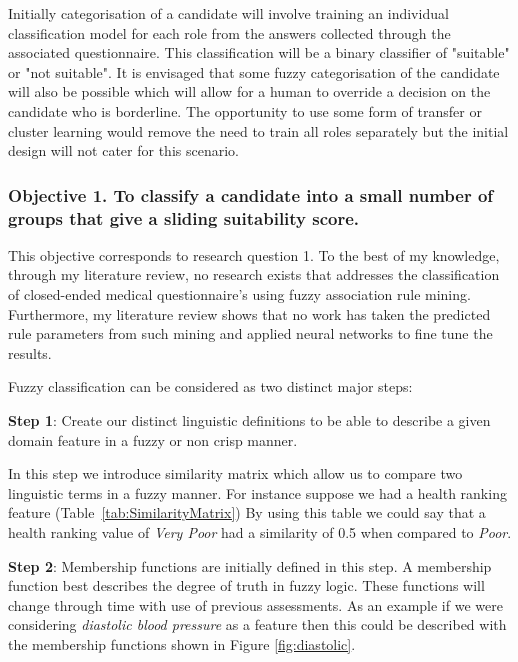 Initially categorisation of a candidate will involve training an individual classification model for each role from
the answers collected through the associated questionnaire. This classification will be a binary classifier
of "suitable" or "not suitable". It is envisaged that some fuzzy categorisation of the candidate will also be
possible which will allow for a human to override a decision on the candidate who is borderline. The opportunity
to use some form of transfer or cluster learning would remove the need to train all roles separately but the initial
design will not cater for this scenario.

\subsubsection{Objective 1. To classify a candidate into a small number of groups that give a sliding suitability score.}

This objective corresponds to research question 1. To the best of my knowledge, through my literature review, no research exists that addresses the classification of closed-ended medical questionnaire's using fuzzy association rule mining. Furthermore, my literature review shows that no work has taken the predicted rule parameters from such mining and applied neural networks to fine tune the results.

\noindent
Fuzzy classification can be considered as two distinct major steps:

\noindent
\textbf{Step 1}: Create our distinct linguistic definitions to be able to describe a given domain feature in a fuzzy or non crisp manner.

In this step we introduce similarity matrix which allow us to compare two linguistic terms in a fuzzy manner. For instance suppose we had a health ranking feature (Table~\ref{tab:SimilarityMatrix}) By using this table we could say that a health ranking value of \textit{Very Poor} had a similarity of 0.5 when compared to \textit{Poor}.



\noindent
\textbf{Step 2}: Membership functions are initially defined in this step. A membership function best describes the degree of truth in fuzzy logic. These functions will change through time with use of previous assessments. As an example if we were considering \textit{diastolic blood pressure} as a feature then this could be described with the membership functions shown in Figure \ref{fig:diastolic}.

